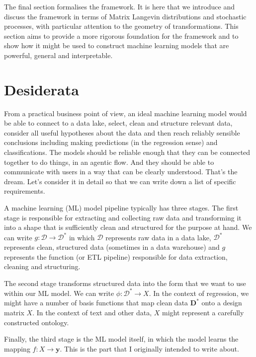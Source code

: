 \documentclass[11pt]{article}
\begin{document}
	The final section formalises the framework. It is here that we introduce and discuss the framework in terms of Matrix Langevin distributions and stochastic processes, with particular attention to the geometry of transformations. This section aims to provide a more rigorous foundation for the framework and to show how it might be used to construct machine learning models that are powerful, general and interpretable.
	
	\section{Desiderata}
	
	From a practical business point of view, an ideal machine learning model would be able to connect to a data lake, select, clean and structure relevant data, consider all useful hypotheses about the data and then reach reliably sensible conclusions including making predictions (in the regression sense) and classifications. The models should be reliable enough that they can be connected together to do things, in an agentic flow. And they should be able to communicate with users in a way that can be clearly understood. That's the dream. Let's consider it in detail so that we can write down a list of specific requirements.
	
	A machine learning (ML) model pipeline typically has three stages. The first stage is responsible for extracting and collecting raw data and transforming it into a shape that is sufficiently clean and structured for the purpose at hand.  We can write $g: \mathcal{D} \rightarrow \mathcal{D}^{*}$ in which $\mathcal{D}$ represents raw data in a data lake, $\mathcal{D}^{*}$ represents clean, structured data (sometimes in a data warehouse) and $g$ represents the function (or ETL pipeline) responsible for data extraction, cleaning and structuring.
	
	The second stage transforms structured data into the form that we want to use within our ML model. We can write $\phi: \mathcal{D}^{*} \rightarrow X$. In the context of regression, we might have a number of basis functions that map clean data $\boldsymbol{D}^{*}$ onto a design matrix $X$. In the context of text and other data, $X$ might represent a carefully constructed ontology. 
	
	Finally, the third stage is the ML model itself, in which the model learns the mapping $f: X \rightarrow \boldsymbol{y}$. This is the part that I originally intended to write about. 
	
\end{document}
